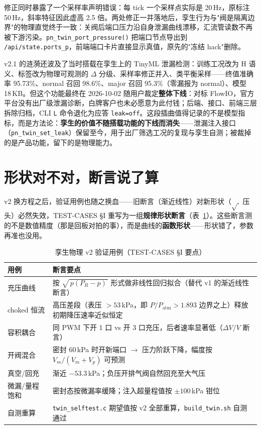 修正同时暴露了一个采样率声明错误：每 tick 一个采样点实际是 20\,Hz，原标注 50\,Hz，斜率特征因此虚高 2.5 倍。两处修正一并落地后，孪生行为与"阀是隔离边界"的物理直觉终于一致：关阀后端口压力沿自身泄漏曲线漂移，汇流管读数不再被下游污染。\texttt{pn\_twin\_port\_pressure()} 把端口节点导出到 \texttt{/api/state.ports\_p}，前端端口卡片直接显示真值，原先的"冻结 hack"删除。

v2.1 的涟漪还波及了当时搭载在孪生上的 TinyML 泄漏检测：训练工况改为 H 语义、标签改为物理可观测的 $\Delta$ 分级、采样率修正并入、类平衡采样——终值准确率 95.73\%、normal 召回 98.6\%、major 召回 95.3\%（零漏报为 normal）、模型 18\,KB。但这个功能最终在 2026-10-02 随用户裁定\textbf{整体下线}：对标 FlowIO，官方平台没有出厂级泄漏诊断，白牌客户也未必愿意为此付钱；后端、接口、前端三层拆除归档，CLI \texttt{L} 命令退化为应答 \texttt{leak=off}。这段插曲值得记录的不是模型指标，而是方法论：\textbf{孪生的价值不随搭载功能的下线而消失}——泄漏注入接口（\texttt{pn\_twin\_set\_leak}）保留至今，用于出厂筛选工况的复现与孪生自测；被裁掉的是产品功能，留下的是物理能力。

\section{形状对不对，断言说了算}
\label{sec:twin-tests}

v2 换方程之后，验证用例也随之换血——旧断言（渐近线性）对新形状（$\sqrt{\ }$ 压头）必然失效，TEST-CASES \S I 重写为一组\textbf{规律形状断言}（表~\ref{tab:twin-tests}）。这些断言测的不是数值精度（那是回板对拍的事），而是曲线的\textbf{函数形状}——形状错了，参数再准也没用。

\begin{table}[htbp]
  \centering
  \caption{孪生物理 v2 验证用例（TEST-CASES \S I 要点）}
  \label{tab:twin-tests}
  \begin{tabular}{lp{8.6cm}}
    \toprule
    用例 & 断言要点 \\
    \midrule
    充压曲线 & 按 $\sqrt{\,p(P_R-p)\,}$ 形式做非线性回归拟合（替代 v1 的渐近线性断言） \\
    choked 恒流 & 高压差段（表压 $>53$\,kPa，即 $P/P_\text{atm}>1.893$ 边界之上）释放初期降压速率近似恒定 \\
    容积耦合 & 同 PWM 下开 1 口 vs 开 3 口充压，后者速率显著低（$\Delta V/V$ 断言） \\
    开阀混合 & 密封 60\,kPa 时开新端口 $\to$ 压力阶跃下降，幅度按 $V_m/(V_m+V_p)$ 可预测 \\
    真空/回充 & 渐近 $-53.3$\,kPa；负压开排气阀自然回充至大气压 \\
    微漏/量程饱和 & 密封态按微漏率缓降；注入超量程值按 $\pm100$\,kPa 钳位 \\
    自测重算 & \texttt{twin\_selftest.c} 期望值按 v2 全部重算，\texttt{build\_twin.sh} 自测通过 \\
    \bottomrule
  \end{tabular}
\end{table}

